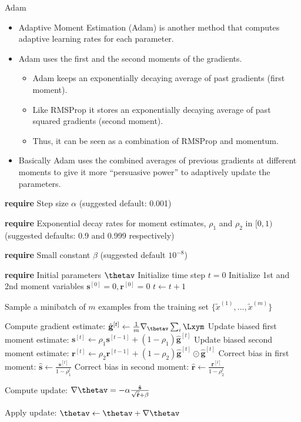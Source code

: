 \begin{vbframe}{Adam}
  \begin{itemize}
    \item Adaptive Moment Estimation (Adam) is another method that computes adaptive learning rates for each parameter.
    \item Adam uses the first and the second moments of the gradients.
      \begin{itemize}
        \item Adam keeps an exponentially decaying average of past gradients (first moment).
        \item Like RMSProp it stores an exponentially decaying average of past squared gradients (second moment).
        \item Thus, it can be seen as a combination of RMSProp and momentum.
      \end{itemize}
    \item Basically Adam uses the combined averages of previous gradients at different moments to give it more \enquote{persuasive power} to adaptively update the parameters.
  \end{itemize}
  
  
\framebreak

\begin{algorithm}[H]
  \scriptsize 
  \caption{Adam}
  \begin{algorithmic}[1]
  \State \textbf{require} Step size $\alpha$ (suggested default: 0.001) \strut
  \State \parbox[t]{\dimexpr\linewidth-\algorithmicindent}{\textbf{require} Exponential decay rates for moment estimates, $\rho_1$ and $\rho_2$ in $[0,1)$ (suggested defaults: 0.9 and 0.999 respectively)} \strut
  \State \parbox[t]{\dimexpr\linewidth-\algorithmicindent}{\textbf{require} Small constant $\beta$ (suggested default $10^{-8}$) \strut}
  \State \textbf{require} Initial parameters $\thetav$ 
  \State Initialize time step $t = 0$
  \State Initialize 1st and 2nd moment variables $\mathbf{s}^{[0]} = 0, \mathbf{r}^{[0]} = 0$
      \State $t \leftarrow t + 1$
      \State \parbox[t]{\dimexpr\linewidth-\algorithmicindent}{Sample a minibatch of $m$ examples from the training set $\{\tilde{x}^{(1)},\dots,\tilde{x}^{(m)}\}$ \strut}
      \State Compute gradient estimate: $\hat{\mathbf{g}}^{[t]} \leftarrow \frac{1}{m} \nabla_{\thetav} \sum_{i} \Lxym$
      \State Update biased first moment estimate: $\mathbf{s}^{[t]} \leftarrow \rho_1 \mathbf{s}^{[t-1]}  + (1 - \rho_1) \hat{\mathbf{g}}^{[t]}$
      \State Update biased second moment estimate: $\mathbf{r}^{[t]} \leftarrow \rho_2 \mathbf{r}^{[t-1]}  + (1 - \rho_2) \hat{\mathbf{g}}^{[t]} \odot \hat{\mathbf{g}}^{[t]}$
      \State Correct bias in first moment: $\hat{\mathbf{s}} \leftarrow \frac{\mathbf{s}^{[t]} }{1-\rho_1^t}$
      \State Correct bias in second moment: $\hat{\mathbf{r}} \leftarrow \frac{\mathbf{r}^{[t]} }{1-\rho_2^t}$
      \State \parbox[t]{\dimexpr\linewidth-\algorithmicindent}{Compute update: $\nabla\thetav = - \alpha \frac{\hat{\mathbf{s}}}{\sqrt{\hat{\mathbf{r}}} + \beta}$ \strut}
      \State Apply update: $\thetav \leftarrow \thetav + \nabla\thetav$
      

\end{algorithmic}
\end{algorithm}
\end{vbframe}
